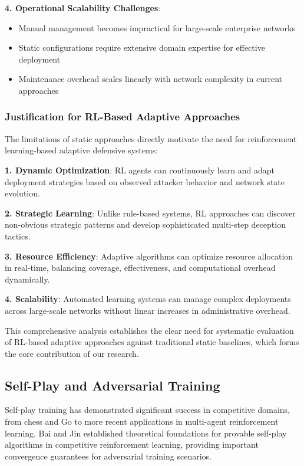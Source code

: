 \documentclass[12pt,twoside]{article}
\theoremstyle{definition}
\theoremstyle{plain}
\begin{document}
\textbf{4. Operational Scalability Challenges}:
\begin{itemize}
\item Manual management becomes impractical for large-scale enterprise networks
\item Static configurations require extensive domain expertise for effective deployment
\item Maintenance overhead scales linearly with network complexity in current approaches
\end{itemize}

\subsubsection{Justification for RL-Based Adaptive Approaches}

The limitations of static approaches directly motivate the need for reinforcement learning-based adaptive defensive systems:

\textbf{1. Dynamic Optimization}: RL agents can continuously learn and adapt deployment strategies based on observed attacker behavior and network state evolution.

\textbf{2. Strategic Learning}: Unlike rule-based systems, RL approaches can discover non-obvious strategic patterns and develop sophisticated multi-step deception tactics.

\textbf{3. Resource Efficiency}: Adaptive algorithms can optimize resource allocation in real-time, balancing coverage, effectiveness, and computational overhead dynamically.

\textbf{4. Scalability}: Automated learning systems can manage complex deployments across large-scale networks without linear increases in administrative overhead.

This comprehensive analysis establishes the clear need for systematic evaluation of RL-based adaptive approaches against traditional static baselines, which forms the core contribution of our research.

\subsection{Self-Play and Adversarial Training}

Self-play training has demonstrated significant success in competitive domains, from chess and Go to more recent applications in multi-agent reinforcement learning. Bai and Jin \cite{bai2020provable} established theoretical foundations for provable self-play algorithms in competitive reinforcement learning, providing important convergence guarantees for adversarial training scenarios.
\end{document}
